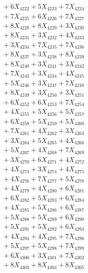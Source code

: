\documentclass[a4paper,10pt]{article}
\begin{document}
{\begin{align}
&\;  + 6 X_{4222} + 5 X_{4223} + 7 X_{4224} \\[0.3ex]
&\;  + 7 X_{4225} + 6 X_{4226} + 7 X_{4227} \\[0.3ex]
&\;  + 8 X_{4228} + 8 X_{4229} + 3 X_{4230} \\[0.3ex]
&\;  + 8 X_{4231} + 3 X_{4232} + 4 X_{4233} \\[0.3ex]
&\;  + 3 X_{4234} + 7 X_{4235} + 7 X_{4236} \\[0.3ex]
&\;  + 8 X_{4237} + 3 X_{4238} + 8 X_{4239} \\[0.5ex]\allowbreak
&\;  + 8 X_{4240} + 3 X_{4241} + 3 X_{4242} \\[0.3ex]
&\;  + 7 X_{4243} + 3 X_{4244} + 4 X_{4245} \\[0.3ex]
&\;  + 5 X_{4246} + 3 X_{4247} + 7 X_{4248} \\[0.3ex]
&\;  + 8 X_{4249} + 3 X_{4250} + 3 X_{4251} \\[0.3ex]
&\;  + 6 X_{4252} + 6 X_{4253} + 7 X_{4254} \\[0.3ex]
&\;  + 4 X_{4255} + 5 X_{4256} + 5 X_{4257} \\[0.3ex]
&\;  + 6 X_{4258} + 5 X_{4259} + 5 X_{4260} \\[0.3ex]
&\;  + 7 X_{4261} + 4 X_{4262} + 3 X_{4263} \\[0.3ex]
&\;  + 3 X_{4264} + 5 X_{4265} + 4 X_{4266} \\[0.3ex]
&\;  + 5 X_{4267} + 4 X_{4268} + 7 X_{4269} \\[0.5ex]\allowbreak
&\;  + 3 X_{4270} + 6 X_{4271} + 4 X_{4272} \\[0.3ex]
&\;  + 4 X_{4273} + 3 X_{4274} + 4 X_{4275} \\[0.3ex]
&\;  + 4 X_{4276} + 7 X_{4277} + 5 X_{4278} \\[0.3ex]
&\;  + 4 X_{4279} + 4 X_{4280} + 6 X_{4281} \\[0.3ex]
&\;  + 6 X_{4282} + 5 X_{4283} + 6 X_{4284} \\[0.3ex]
&\;  + 4 X_{4285} + 5 X_{4286} + 6 X_{4287} \\[0.3ex]
&\;  + 5 X_{4288} + 5 X_{4289} + 6 X_{4290} \\[0.3ex]
&\;  + 5 X_{4291} + 5 X_{4292} + 6 X_{4293} \\[0.3ex]
&\;  + 4 X_{4294} + 4 X_{4295} + 7 X_{4296} \\[0.3ex]
&\;  + 5 X_{4297} + 5 X_{4298} + 7 X_{4299} \\[0.5ex]\allowbreak
&\;  + 6 X_{4300} + 3 X_{4301} + 7 X_{4302} \\[0.3ex]
&\;  + 8 X_{4303} + 8 X_{4304} + 8 X_{4305} \\[0.3ex]

\end{align}}
\end{document}

